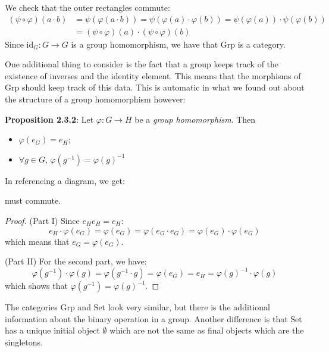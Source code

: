 \documentclass{report}
\begin{document}
We check that the outer rectangles commute:
    \begin{align*}
        (\psi \circ \varphi)(a \cdot b) &= \psi(\varphi(a \cdot b)) = \psi(\varphi(a) \cdot \varphi(b)) = \psi(\varphi(a)) \cdot \psi(\varphi(b)) \\
                                        &= (\psi \circ \varphi)(a) \cdot (\psi \circ \varphi)(b)                             
    \end{align*}
Since $\text{id}_{G} : G \rightarrow G$ is a group homomorphism, we have that $\text{Grp}$ is a category.

One additional thing to consider is the fact that a group keeps track of the existence of inverses and the identity element. This means that the morphisms of $\text{Grp}$ should keep track of this data. This is automatic in what we found out about the structure of a group homomorphism however:

\textbf{Proposition 2.3.2}: Let $\varphi: G \rightarrow H$ be a \textit{group homomorphism}. Then
    \begin{itemize}
        \item $\varphi(e_{G}) = e_{H}$;

        \item $\forall g \in G$, $\varphi(g^{-1}) = \varphi(g)^{-1}$
    \end{itemize}
In referencing a diagram, we get:
    \begin{center}
    \end{center}
must commute.
    \begin{proof}
        (Part I) Since $e_{H}e_{H} = e_{H}$:
            \begin{equation*}
                e_{H} \cdot \varphi(e_{G}) = \varphi(e_{G}) = \varphi(e_{G} \cdot e_{G}) = \varphi(e_{G}) \cdot \varphi(e_{G})
            \end{equation*}
        which means that $e_{G} = \varphi(e_{G})$.

        (Part II) For the second part, we have:
            \begin{equation*}
                \varphi(g^{-1}) \cdot \varphi(g) = \varphi(g^{-1} \cdot g) = \varphi(e_{G}) = e_{H} = \varphi(g)^{-1} \cdot \varphi(g)
            \end{equation*}
        which shows that $\varphi(g^{-1}) = \varphi(g)^{-1}$.
    \end{proof}
The categories $\text{Grp}$ and $\text{Set}$ look very similar, but there is the additional information about the binary operation in a group. Another difference is that $\text{Set}$ has a unique initial object $\emptyset$ which are not the same as final objects which are the singletons. 
\end{document}
